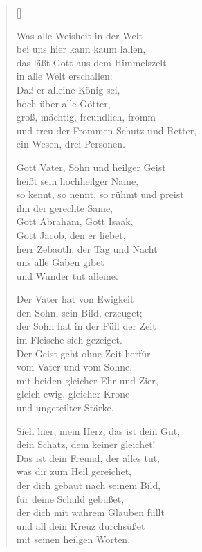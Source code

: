 \begin{multicols}{2}
\settowidth{\versewidth}{und treu der Frommen Schutz und Retter,}
\begin{verse}[\versewidth]

 Was alle Weisheit in der Welt\\
bei uns hier kann kaum lallen,\\
das läßt Gott aus dem Himmelszelt\\
in alle Welt erschallen:\\
Daß er alleine König sei,\\
hoch über alle Götter,\\
groß, mächtig, freundlich, fromm \\
und treu der Frommen Schutz und Retter,\\
ein Wesen, drei Personen.

 Gott Vater, Sohn und heilger Geist\\
heißt sein hochheilger Name,\\
so kennt, so nennt, so rühmt und preist\\
ihn der gerechte Same,\\
Gott Abraham, Gott Isaak,\\
Gott Jacob, den er liebet,\\
herr Zebaoth, der Tag und Nacht\\
uns alle Gaben gibet\\
und Wunder tut alleine.

 Der Vater hat von Ewigkeit\\
den Sohn, sein Bild, erzeuget;\\
der Sohn hat in der Füll der Zeit\\
im Fleische sich gezeiget.\\
Der Geist geht ohne Zeit herfür\\
vom Vater und vom Sohne,\\
mit beiden gleicher Ehr und Zier,\\
gleich ewig, gleicher Krone\\
und ungeteilter Stärke.

 Sieh hier, mein Herz, das ist dein Gut,\\
dein Schatz, dem keiner gleichet!\\
Das ist dein Freund, der alles tut,\\
was dir zum Heil gereichet,\\
der dich gebaut nach seinem Bild,\\
für deine Schuld gebüßet,\\
der dich mit wahrem Glauben füllt\\
und all dein Kreuz durchsüßet\\
mit seinen heilgen Worten.


\end{verse}
\end{multicols}
